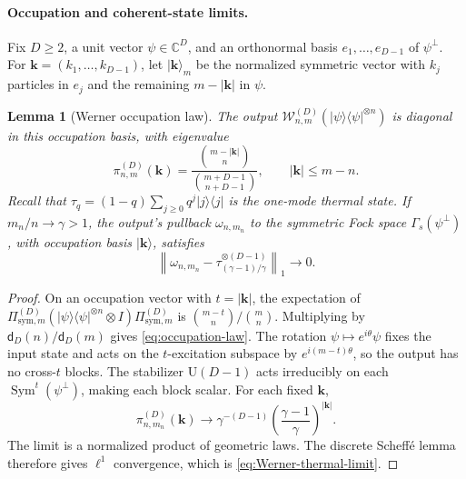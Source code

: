 \documentclass[11pt]{article}
\newtheorem{lemma}[lemma]{Lemma}
\theoremstyle{remark}
\theoremstyle{plain}
\newcommand{\C}{\mathbb C}
\newcommand{\U}{\mathrm U}
\newcommand{\ket}[1]{|#1\rangle}
\newcommand{\proj}[1]{|#1\rangle\!\langle #1|}
\newcommand{\ot}{\otimes}
\begin{document}
\paragraph{Occupation and coherent-state limits.}
Fix \(D\ge2\), a unit vector \(\psi\in\C^D\), and an orthonormal basis
\(e_1,\ldots,e_{D-1}\) of \(\psi^\perp\).  For
\(\mathbf k=(k_1,\ldots,k_{D-1})\), let \(\ket{\mathbf k}_m\) be the
normalized symmetric vector with \(k_j\) particles in \(e_j\) and the
remaining \(m-|\mathbf k|\) in \(\psi\).

\begin{lemma}[Werner occupation law]
\label{lem:Werner-Fock}
The output \(\mathcal W_{n,m}^{(D)}(\proj\psi^{\ot n})\) is diagonal
in this occupation basis, with eigenvalue
\begin{equation}\label{eq:occupation-law}
  \pi_{n,m}^{(D)}(\mathbf k)
  =\frac{\binom{m-|\mathbf k|}{n}}
         {\binom{m+D-1}{n+D-1}},
  \qquad |\mathbf k|\le m-n.
\end{equation}
Recall that \(\tau_q=(1-q)\sum_{j\ge0}q^j\proj{j}\) is the
one-mode thermal state.
If \(m_n/n\to\gamma>1\), the output's pullback \(\omega_{n,m_n}\) to the
symmetric Fock space \(\Gamma_s(\psi^\perp)\), with occupation basis
\(\ket{\mathbf k}\), satisfies
\begin{equation}\label{eq:Werner-thermal-limit}
  \left\|\omega_{n,m_n}
    -\tau_{(\gamma-1)/\gamma}^{\ot(D-1)}\right\|_1
  \longrightarrow0.
\end{equation}
\end{lemma}

\begin{proof}
On an occupation vector with \(t=|\mathbf k|\), the expectation of
\(\Pi_{\mathrm{sym},m}^{(D)}
 (\proj\psi^{\ot n}\ot I)
 \Pi_{\mathrm{sym},m}^{(D)}\)
is \(\binom{m-t}{n}/\binom mn\).  Multiplying by
\(\mathsf d_D(n)/\mathsf d_D(m)\) gives
\eqref{eq:occupation-law}.  The rotation \(\psi\mapsto e^{i\theta}\psi\)
fixes the input state and acts on the \(t\)-excitation subspace by
\(e^{i(m-t)\theta}\), so the output has no cross-\(t\) blocks.
The stabilizer \(\U(D-1)\) acts irreducibly on each
\(\operatorname{Sym}^t(\psi^\perp)\), making each block scalar.
For each fixed \(\mathbf k\),
\[
  \pi_{n,m_n}^{(D)}(\mathbf k)
  \longrightarrow
  \gamma^{-(D-1)}
  \left(\frac{\gamma-1}{\gamma}\right)^{|\mathbf k|}.
\]
The limit is a normalized product of geometric laws.  The discrete
Scheff\'e lemma therefore gives \(\ell^1\) convergence, which is
\eqref{eq:Werner-thermal-limit}.
\end{proof}
\end{document}
